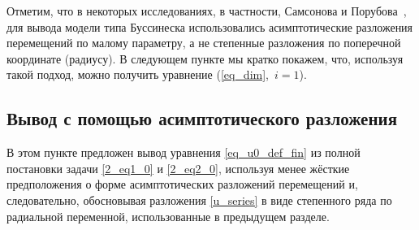 \documentclass[12pt, a4paper]{report}
\begin{document}
Отметим, что в некоторых исследованиях, в частности, Самсонова и Порубова~\cite{SP, S_book, P_book}, для вывода модели типа Буссинеска использовались асимптотические разложения перемещений по малому параметру, а не степенные разложения по поперечной координате (радиусу). В следующем пункте мы кратко покажем, что, используя такой подход, можно получить уравнение (\ref{eq_dim},~$i=1$).



\subsection{Вывод с помощью асимптотического разложения}
В этом пункте предложен вывод уравнения \eqref{eq_u0_def_fin} из полной постановки задачи \eqref{2_eq1_0} и \eqref{2_eq2_0}, используя менее жёсткие предположения о форме асимптотических разложений перемещений и, следовательно, обосновывая разложения \eqref{u_series} в виде степенного ряда по радиальной переменной, использованные в предыдущем разделе.
\end{document}
